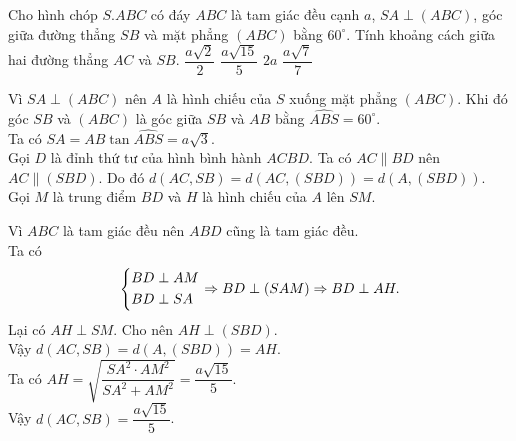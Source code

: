 \begin{ex}%
 Cho hình chóp $S.ABC$ có đáy $ABC$ là tam giác đều cạnh $a$, $SA \perp (ABC)$, góc giữa đường thẳng $SB$ và mặt phẳng $(ABC)$ bằng $60^\circ$. Tính khoảng cách giữa hai đường thẳng $AC$ và $SB$.
 \choice
  {$\dfrac{a\sqrt{2}}{2}$}
  {\True $\dfrac{a\sqrt{15}}{5}$}
  {$2a$}
  {$\dfrac{a\sqrt{7}}{7}$}
 \loigiai
  {
  \immini
  {
  Vì $SA \perp (ABC)$ nên $A$ là hình chiếu của $S$ xuống mặt phẳng $(ABC)$. Khi đó góc $SB$ và $(ABC)$ là góc giữa $SB$ và $AB$ bằng $\widehat{ABS} = 60^\circ$.\\
  Ta có $SA = AB \tan \widehat{ABS} = a \sqrt{3}$.\\
  Gọi $D$ là đỉnh thứ tư của hình bình hành $ACBD$. Ta có $AC \parallel BD$ nên $AC \parallel (SBD)$. Do đó $d(AC, SB) = d(AC,(SBD)) = d(A, (SBD))$.\\
  Gọi $M$ là trung điểm $BD$ và $H$ là hình chiếu của $A$ lên $SM$.
  }
  {
  }
  \noindent Vì $ABC$ là tam giác đều nên $ABD$ cũng là tam giác đều.\\
  Ta có
  $$\left\{\begin{aligned}& BD \perp AM \\& BD \perp SA\end{aligned}\right. \Rightarrow BD \perp (SAM) \Rightarrow BD \perp AH.$$
  Lại có $AH \perp SM$. Cho nên $AH \perp (SBD)$.\\
  Vậy $d(AC, SB) = d(A, (SBD)) = AH$.\\
  Ta có $AH = \sqrt{\dfrac{SA^2 \cdot AM^2}{SA^2 + AM^2}} = \dfrac{a \sqrt{15}}{5}$.\\
  Vậy $d(AC, SB) = \dfrac{a \sqrt{15}}{5}$.
  }
\end{ex}


